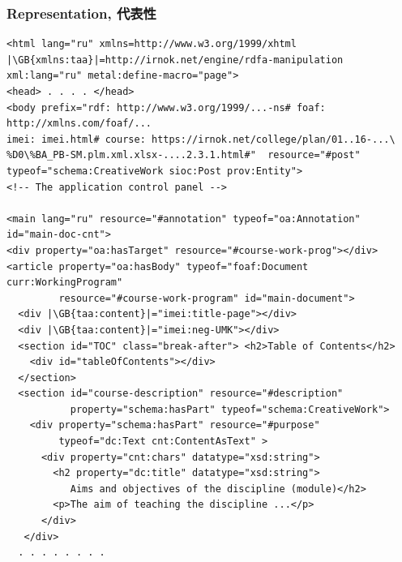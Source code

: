 \documentclass[10pt]{beamer}
\newcommand{\GB}[1]{\colorbox{green}{#1}}
\newcommand{\btprgsize}{\fontsize{7}{7}\selectfont}
\begin{document}
\begin{frame}
  \frametitle{Representation, 代表性}

\begin{adjustwidth}{-1.5em}{-1.5em}
\begin{verbatim}
<html lang="ru" xmlns=http://www.w3.org/1999/xhtml
|\GB{xmlns:taa}|=http://irnok.net/engine/rdfa-manipulation
xml:lang="ru" metal:define-macro="page">
<head> . . . . </head>
<body prefix="rdf: http://www.w3.org/1999/...-ns# foaf: http://xmlns.com/foaf/...
imei: imei.html# course: https://irnok.net/college/plan/01..16-...\
%D0\%BA_PB-SM.plm.xml.xlsx-....2.3.1.html#"  resource="#post"
typeof="schema:CreativeWork sioc:Post prov:Entity">
<!-- The application control panel -->

<main lang="ru" resource="#annotation" typeof="oa:Annotation" id="main-doc-cnt">
<div property="oa:hasTarget" resource="#course-work-prog"></div>
<article property="oa:hasBody" typeof="foaf:Document curr:WorkingProgram"
         resource="#course-work-program" id="main-document">
  <div |\GB{taa:content}|="imei:title-page"></div>
  <div |\GB{taa:content}|="imei:neg-UMK"></div>
  <section id="TOC" class="break-after"> <h2>Table of Contents</h2>
    <div id="tableOfContents"></div>
  </section>
  <section id="course-description" resource="#description"
           property="schema:hasPart" typeof="schema:CreativeWork">
    <div property="schema:hasPart" resource="#purpose"
         typeof="dc:Text cnt:ContentAsText" >
      <div property="cnt:chars" datatype="xsd:string">
        <h2 property="dc:title" datatype="xsd:string">
           Aims and objectives of the discipline (module)</h2>
        <p>The aim of teaching the discipline ...</p>
      </div>
   </div>
  . . . . . . . .
\end{verbatim}
\end{adjustwidth}
\end{frame}
\end{document}
